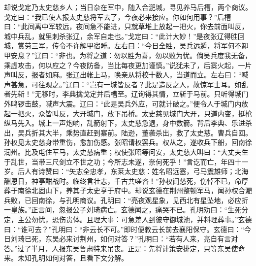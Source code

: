 却说戈定乃太史慈乡人；当日杂在军中，随入合淝城，寻见养马后槽，两个商议。戈定曰：“我已使人报太史慈将军去了，今夜必来接应。你如何用事？”后槽曰：“此间离中军较远，夜间急不能进，只就草堆上放起一把火，你去前面叫反，城中兵乱，就里刺杀张辽，余军自走也。”戈定曰：“此计大妙！”是夜张辽得胜回城，赏劳三军，传令不许解甲宿睡。左右曰：“今日全胜，吴兵远遁，将军何不卸甲安息？”辽曰：“非也。为将之道：勿以胜为喜，勿以败为忧。倘吴兵度我无备，乘虚攻击，何以应之？今夜防备，当比每夜更加谨慎。”说犹未了，后寨火起，一片声叫反，报者如麻。张辽出帐上马，唤亲从将校十数人，当道而立。左右曰：“喊声甚急，可往观之。”辽曰：“岂有一城皆反者？此是造反之人，故惊军士耳。如乱者先斩！”无移时，李典擒戈定并后槽至。辽询得其情，立斩于马前。只听得城门外鸣锣击鼓，喊声大震。辽曰：“此是吴兵外应，可就计破之。”便令人于城门内放起一把火，众皆叫反，大开城门，放下吊桥。太史慈见城门大开，只道内变，挺枪纵马先入。城上一声炮响，乱箭射下，太史慈急退，身中数箭。背后李典、乐进杀出，吴兵折其大半，乘势直赶到寨前。陆逊，董袭杀出，救了太史慈。曹兵自回。孙权见太史慈身带重伤，愈加伤感。张昭请权罢兵。权从之，遂收兵下船，回南徐润州。比及屯住军马，太史慈病重；权使张昭等问安，太史慈大叫曰：“大丈夫生于乱世，当带三尺剑立不世之功；今所志未遂，奈何死乎！”言讫而亡，年四十一岁。后人有诗赞曰：“矢志全忠孝，东莱太史慈：姓名昭远塞，弓马震雄师；北海酬恩日，神亭酣战时。临终言壮志，千古共嗟咨！”孙权闻慈死，伤悼不已，命厚葬于南徐北固山下，养其子太史亨于府中。却说玄德在荆州整顿军马，闻孙权合淝兵败，已回南徐，与孔明商议。孔明曰：“亮夜观星象，见西北有星坠地，必应折一皇族。”正言间，忽报公子刘琦病亡。玄德闻之，痛哭不已。孔明劝曰：“生死分定，主公勿忧，恐伤贵体。且理大事：可急差人到彼守御城池，并料理葬事。”玄德曰：“谁可去？”孔明曰：“非云长不可。”即时便教云长前去襄阳保守。玄德曰：“今日刘琦已死，东吴必来讨荆州，如何对答？”孔明曰：“若有人来，亮自有言对答。”过了半月，人报东吴鲁肃特来吊丧。正是：先将计策安排定，只等东吴使命来。未知孔明如何对答，且看下文分解。